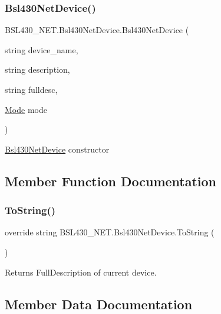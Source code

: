 \subsubsection{\texorpdfstring{Bsl430NetDevice()}{Bsl430NetDevice()}\hspace{0.1cm}{\footnotesize\ttfamily [3/3]}}
{\footnotesize\ttfamily B\+S\+L430\+\_\+\+N\+E\+T.\+Bsl430\+Net\+Device.\+Bsl430\+Net\+Device (\begin{DoxyParamCaption}\item[{string}]{device\+\_\+name,  }\item[{string}]{description,  }\item[{string}]{fulldesc,  }\item[{\mbox{\hyperlink{namespace_b_s_l430___n_e_t_aa1c6981cb6f279b5491d861ca555a1d7}{Mode}}}]{mode }\end{DoxyParamCaption})}



\mbox{\hyperlink{class_b_s_l430___n_e_t_1_1_bsl430_net_device}{Bsl430\+Net\+Device}} constructor 



\subsection{Member Function Documentation}
\mbox{\label{class_b_s_l430___n_e_t_1_1_bsl430_net_device_a43945e4e1fab52852ee31dd826ca079c}} 
\subsubsection{\texorpdfstring{ToString()}{ToString()}}
{\footnotesize\ttfamily override string B\+S\+L430\+\_\+\+N\+E\+T.\+Bsl430\+Net\+Device.\+To\+String (\begin{DoxyParamCaption}{ }\end{DoxyParamCaption})}



Returns Full\+Description of current device. 



\subsection{Member Data Documentation}
\mbox{\label{class_b_s_l430___n_e_t_1_1_bsl430_net_device_a9484d2670f3328159a0b250d82995bc5}} 
